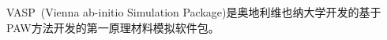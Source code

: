 \label{lab:VASP}
\textrm{VASP~(Vienna ab-initio Simulation Package)}是奥地利维也纳大学开发的基于\textrm{PAW}方法开发的第一原理材料模拟软件包。
